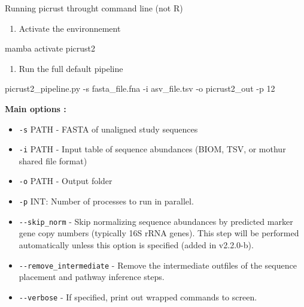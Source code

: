 \documentclass[
]{book}
\newenvironment{Shaded}{\begin{snugshade}}{\end{snugshade}}
\newcommand{\AttributeTok}[1]{\textcolor[rgb]{0.13,0.29,0.53}{#1}}
\newcommand{\ExtensionTok}[1]{#1}
\newcommand{\NormalTok}[1]{#1}
\providecommand{\tightlist}{%
  \setlength{\itemsep}{0pt}\setlength{\parskip}{0pt}}
\begin{document}
Running picrust throught command line (not R)

\begin{enumerate}
\def\labelenumi{\alph{enumi}.}
\tightlist
\item
  Activate the environnement
\end{enumerate}

\begin{Shaded}
\begin{Highlighting}[]
\ExtensionTok{mamba}\NormalTok{ activate picrust2}
\end{Highlighting}
\end{Shaded}

\begin{enumerate}
\def\labelenumi{\alph{enumi}.}
\setcounter{enumi}{1}
\tightlist
\item
  Run the full default pipeline
\end{enumerate}

\begin{Shaded}
\begin{Highlighting}[]
\ExtensionTok{picrust2\_pipeline.py} \AttributeTok{{-}s}\NormalTok{ fasta\_file.fna }\AttributeTok{{-}i}\NormalTok{ asv\_file.tsv }\AttributeTok{{-}o}\NormalTok{ picrust2\_out }\AttributeTok{{-}p}\NormalTok{ 12}
\end{Highlighting}
\end{Shaded}

\textbf{Main options :}

\begin{itemize}
\tightlist
\item
  \texttt{-s} PATH - FASTA of unaligned study sequences
\item
  \texttt{-i} PATH - Input table of sequence abundances (BIOM, TSV, or mothur shared file format)
\item
  \texttt{-o} PATH - Output folder
\item
  \texttt{-p} INT: Number of processes to run in parallel.
\item
  \texttt{-\/-skip\_norm} - Skip normalizing sequence abundances by predicted marker gene copy numbers (typically 16S rRNA genes). This step will be performed automatically unless this option is specified (added in v2.2.0-b).
\item
  \texttt{-\/-remove\_intermediate} - Remove the intermediate outfiles of the sequence placement and pathway inference steps.
\item
  \texttt{-\/-verbose} - If specified, print out wrapped commands to screen.
\end{itemize}
\end{document}
